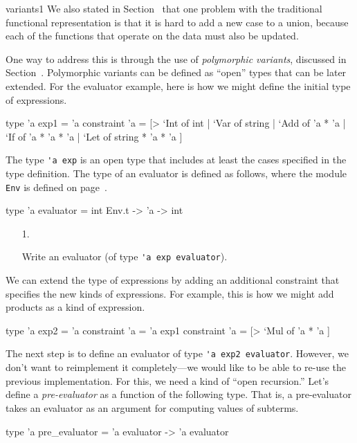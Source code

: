 \begin{exercise}{variants1}
We also stated in
Section~ that one
problem with the traditional functional representation is that it is hard to add a
new case to a union, because each of the functions that operate on the
data must also be updated.

One way to address this is through the use of \emph{polymorphic
variants}, discussed in Section~.
Polymorphic variants can be defined as ``open'' types that can be
later extended.  For the evaluator example, here is how we might
define the initial type of expressions.

\begin{ocaml}
type 'a exp1 = 'a constraint 'a =
 [> `Int of int
  | `Var of string
  | `Add of 'a * 'a
  | `If  of 'a * 'a * 'a
  | `Let of string * 'a * 'a ]
\end{ocaml}
%
The type \lstinline$'a exp$ is an open type that includes at least
the cases specified in the type definition.
The type of an evaluator is defined as follows, where the
module \lstinline$Env$ is defined on
page~\pageref{page:polyclasses-env}.

\begin{ocaml}
type 'a evaluator = int Env.t -> 'a -> int
\end{ocaml}
%
\begin{enumerate}
\item[1.]

Write an evaluator (of type \hbox{\lstinline$'a exp evaluator$}).
\end{enumerate}
%
We can extend the type of expressions by adding an additional constraint
that specifies the new kinds of expressions.  For example, this is how we might
add products as a kind of expression.

\begin{ocaml}
type 'a exp2 = 'a
   constraint 'a = 'a exp1
   constraint 'a = [> `Mul of 'a * 'a ]
\end{ocaml}
%
The next step is to define an evaluator of type
\hbox{\lstinline$'a exp2 evaluator$}.
However, we don't want to reimplement it
completely---we would like to be able to re-use the previous
implementation.  For this, we need a kind of ``open recursion.''
Let's define a \emph{pre-evaluator} as a function of the following
type.  That is, a pre-evaluator takes an evaluator as an argument
for computing values of subterms.

\begin{ocaml}
type 'a pre_evaluator = 'a evaluator -> 'a evaluator


\end{ocaml}
\end{exercise}
